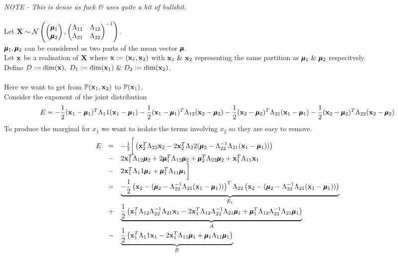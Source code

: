 \documentclass[11pt,a4paper]{article}
\begin{document}
\textit{NOTE - This is dense as fuck \& uses quite a bit of bullshit}.\\
\\Let $\textbf{X}\sim\mathcal{N}\left(\begin{pmatrix}
\pmb{\mu}_1\\\pmb{\mu}_2
\end{pmatrix},\begin{pmatrix}
\Lambda_{11}&\Lambda_{12}\\
\Lambda_{21}&\Lambda_{22}
\end{pmatrix}^{-1}\right)$.\\
$\pmb{\mu}_1,\pmb{\mu}_2$ can be considered as two parts of the mean vector $\pmb{\mu}$.\\
Let $\textbf{x}$ be a realisation of $\textbf{X}$ where $\textbf{x}:=(\textbf{x}_1,\textbf{x}_2)$ with $\textbf{x}_1\ \&\ \textbf{x}_2$ representing the same partition as $\pmb{\mu}_1\ \&\ \pmb{\mu}_2$ respecitvely.\\
Define $D:=\mathrm{dim}(\x),\ D_1:=\mathrm{dim}(\x_1)\ \&\ D_2:=\mathrm{dim}(\x_2)$.\\
\\Here we want to get from $\mathbb{P}(\textbf{x}_1,\textbf{x}_2)$ to $\mathbb{P}(\textbf{x}_1)$.\\
Consider the exponent of the joint distribution
$$E=-\frac{1}{2}(\textbf{x}_1-\pmb{\mu}_1)^T\Lambda_11(\textbf{x}_1-\pmb{\mu}_1)-\frac{1}{2}(\textbf{x}_1-\pmb{\mu}_1)^T\Lambda_{12}(\textbf{x}_2-\pmb{\mu}_2)-\frac{1}{2}(\textbf{x}_2-\pmb{\mu}_2)^T\Lambda_{21}(\textbf{x}_1-\pmb{\mu}_1)-\frac{1}{2}(\textbf{x}_2-\pmb{\mu}_2)^T\Lambda_{22}(\textbf{x}_2-\pmb{\mu}_2)$$
To produce the marginal for $x_1$ we want to isolate the terms involving $x_2$ so they are easy to remove.
\[\begin{array}{rcl}
E&=&-\frac{1}{2}\bigg[\left(\textbf{x}_2^T\Lambda_{22}\textbf{x}_2-2\textbf{x}_2^T\Lambda_22(\pmb{\mu}_2-\Lambda_{22}^{-1}\Lambda_{21}(\textbf{x}_1-\pmb{\mu}_1))\right)\\
&-&2\textbf{x}_1^T\Lambda_{12}\pmb{\mu}_2+2\pmb{\mu}_1^T\Lambda_{12}\pmb{\mu}_2+\pmb{\mu}_2^T\Lambda_{22}\pmb{\mu}_2+\textbf{x}_1^T\Lambda_{11}\textbf{x}_1\\
&-&2\textbf{x}_1^T\Lambda_11\pmb{\mu}_1+\pmb{\mu}_1^T\Lambda_{11}\pmb{\mu}_1\bigg]\\
&=&\underbrace{-\frac{1}{2}\left(\textbf{x}_2-(\pmb{\mu}_2-\Lambda_{22}^{-1}\Lambda_{21}(\textbf{x}_1-\pmb{\mu}_1))\right)^T\Lambda_{22}\left(\textbf{x}_2-(\pmb{\mu}_2-\Lambda_{22}^{-1}\Lambda_{21}(\textbf{x}_1-\pmb{\mu}_1))\right)}_{E_1}\\
&+&\underbrace{\frac{1}{2}\left(\textbf{x}_1^T\Lambda_{12}\Lambda_{22}^{-1}\Lambda_{21}\textbf{x}_1-2\textbf{x}_1^T\Lambda_{12}\Lambda_{22}^{-1}\Lambda_{21}\pmb{\mu}_1+\pmb{\mu}_1^T\Lambda_{12}\Lambda_{22}^{-1}\Lambda_{21}\pmb{\mu}_1\right)}_{A}\\
&-&\underbrace{\frac{1}{2}\left(\textbf{x}_1^T\Lambda_11\textbf{x}_1-2\textbf{x}_1^T\Lambda_{11}\pmb{\mu}_1+\pmb{\mu}_{1}\Lambda_{11}\pmb{\mu}_1\right)}_{B}
\end{array}\]
\end{document}
